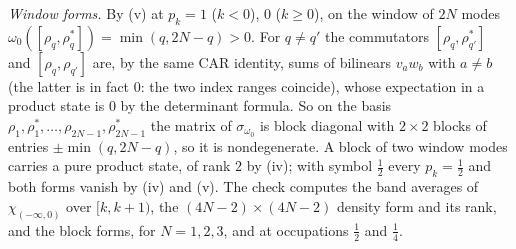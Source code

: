 \emph{Window forms.} By (v) at $p_{k} = 1$ ($k < 0$), $0$ ($k \ge 0$), on the window of $2N$ modes $\omega_{0}([\rho_{q}, \rho_{q}^{*}]) = \min(q, 2N - q) > 0$. For $q \ne q'$ the commutators $[\rho_{q}, \rho_{q'}^{*}]$ and $[\rho_{q}, \rho_{q'}]$ are, by the same CAR identity, sums of bilinears $v_{a}w_{b}$ with $a \ne b$ (the latter is in fact $0$: the two index ranges coincide), whose expectation in a product state is $0$ by the determinant formula. So on the basis $\rho_{1}, \rho_{1}^{*}, \dots, \rho_{2N-1}, \rho_{2N-1}^{*}$ the matrix of $\sigma_{\omega_{0}}$ is block diagonal with $2 \times 2$ blocks of entries $\pm\min(q, 2N - q)$, so it is nondegenerate. A block of two window modes carries a pure product state, of rank $2$ by (iv); with symbol $\tfrac12$ every $p_{k} = \tfrac12$ and both forms vanish by (iv) and (v). The check computes the band averages of $\chi_{(-\infty, 0)}$ over $[k, k + 1)$, the $(4N - 2) \times (4N - 2)$ density form and its rank, and the block forms, for $N = 1, 2, 3$, and at occupations $\tfrac12$ and $\tfrac14$.


